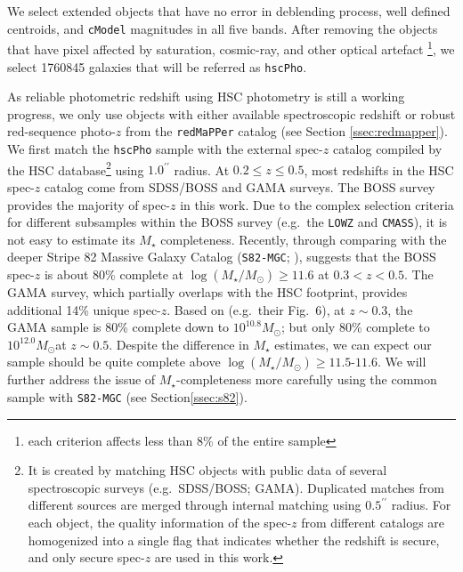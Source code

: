 \documentclass{emulateapj}
\def\arcsec{{\prime\prime}}
\def\msun{$M_\odot$}
\def\redm{\texttt{redMaPPer}}
\def\mstar{{$M_{\star}$}}
\def\logms{{$\log (M_{\star}/M_{\odot})$}}
\begin{document}
\begin{CJK*}{UTF8}{gbsn}
    We select extended objects that have no error in deblending process, well defined 
    centroids, and \texttt{cModel} magnitudes in all five bands. 
    After removing the objects that have pixel affected by saturation, cosmic-ray, and 
    other optical artefact \footnote{each criterion affects less than 8\% of the entire
    sample}, we select 1760845 galaxies that will be referred as \texttt{hscPho}. 
        
    As reliable photometric redshift using HSC photometry is still a working progress, 
    we only use objects with either available spectroscopic redshift or robust 
    red-sequence photo-$z$ from the \redm{} catalog (see Section \ref{ssec:redmapper}).  
    We first match the \texttt{hscPho} sample with the external spec-$z$ catalog 
    compiled by the HSC database\footnote{It is created by matching HSC objects with 
    public data of several spectroscopic surveys (e.g.\ SDSS/BOSS; GAMA). 
    Duplicated matches from different sources are merged through internal matching 
    using $0.5^{\arcsec}$ radius. 
    For each object, the quality information of the spec-$z$ from different catalogs 
    are homogenized into a single flag that indicates whether the redshift is secure, 
    and only secure spec-$z$ are used in this work.}
    using $1.0^{\arcsec}$ radius.
    At $0.2 \leq z \leq 0.5$, most redshifts in the HSC spec-$z$ catalog come from 
    SDSS/BOSS and GAMA surveys.  
    The BOSS survey provides the majority of spec-$z$ in this work.  
    Due to the complex selection criteria for different subsamples within the BOSS
    survey (e.g.\ the \texttt{LOWZ} and \texttt{CMASS}), it is not easy to estimate 
    its \mstar{} completeness.  
    Recently, through comparing with the deeper Stripe 82 Massive Galaxy Catalog
    (\texttt{S82-MGC}; \citealt{Bundy2015}), \citet{Leauthaud2016} suggests that the 
    BOSS spec-$z$ is about 80\% complete at \logms{}$\geq 11.6$ at $0.3 < z < 0.5$. 
    The GAMA survey, which partially overlaps with the HSC footprint, provides 
    additional 14\% unique spec-$z$. 
    Based on \citet{Taylor2011} (e.g.\ their Fig.~6), at $z\sim 0.3$, the GAMA 
    sample is 80\% complete down to $10^{10.8}$\msun; but only 80\% complete to 
    $10^{12.0}$\msun at $z\sim 0.5$. 
    Despite the difference in \mstar{} estimates, we can expect 
    our sample should be quite complete above \logms{}$\geq 11.5$-$11.6$.
    We will further address the issue of \mstar{}-completeness more carefully 
    using the common sample with \texttt{S82-MGC} (see Section\ref{ssec:s82}). 
        

\end{CJK*}
\end{document}
